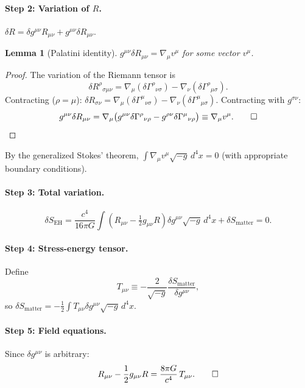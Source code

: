 \documentclass[12pt,a4paper]{article}
\theoremstyle{plain}
\newtheorem{lemma}[theorem]{Lemma}
\theoremstyle{definition}
\theoremstyle{remark}
\begin{document}
\paragraph{Step 2: Variation of $R$.}

$\delta R = \delta g^{\mu\nu}R_{\mu\nu} + g^{\mu\nu}\delta R_{\mu\nu}$.

\begin{lemma}[Palatini identity]
$g^{\mu\nu}\delta R_{\mu\nu} = \nabla_\mu v^\mu$ for some vector $v^\mu$.
\end{lemma}
\begin{proof}
The variation of the Riemann tensor is
\[
  \delta R^\rho{}_{\sigma\mu\nu}
  = \nabla_\mu(\delta\Gamma^\rho{}_{\nu\sigma}) - \nabla_\nu(\delta\Gamma^\rho{}_{\mu\sigma}).
\]
Contracting ($\rho=\mu$): $\delta R_{\sigma\nu} = \nabla_\mu(\delta\Gamma^\mu{}_{\nu\sigma})-\nabla_\nu(\delta\Gamma^\mu{}_{\mu\sigma})$. Contracting with $g^{\sigma\nu}$:
\[
  g^{\mu\nu}\delta R_{\mu\nu} = \nabla_\mu\bigl(g^{\mu\nu}\delta\Gamma^\rho{}_{\nu\rho}-g^{\rho\nu}\delta\Gamma^\mu{}_{\nu\rho}\bigr) \equiv \nabla_\mu v^\mu. \qed
\]
\end{proof}

By the generalized Stokes' theorem, $\int\nabla_\mu v^\mu\sqrt{-g}\,d^4x=0$ (with appropriate boundary conditions).

\paragraph{Step 3: Total variation.}

\[
  \delta S_{\mathrm{EH}}
  = \frac{c^4}{16\pi G}\int\!\left(R_{\mu\nu}-\tfrac{1}{2}g_{\mu\nu}R\right)\delta g^{\mu\nu}\sqrt{-g}\,d^4x + \delta S_{\mathrm{matter}} = 0.
\]

\paragraph{Step 4: Stress-energy tensor.}

Define
\[
  T_{\mu\nu} \equiv -\frac{2}{\sqrt{-g}}\frac{\delta S_{\mathrm{matter}}}{\delta g^{\mu\nu}},
\]
so $\delta S_{\mathrm{matter}} = -\tfrac{1}{2}\int T_{\mu\nu}\delta g^{\mu\nu}\sqrt{-g}\,d^4x$.

\paragraph{Step 5: Field equations.} Since $\delta g^{\mu\nu}$ is arbitrary:
\[
  R_{\mu\nu} - \frac{1}{2}g_{\mu\nu}R = \frac{8\pi G}{c^4}\,T_{\mu\nu}. \qed
\]
\end{document}
